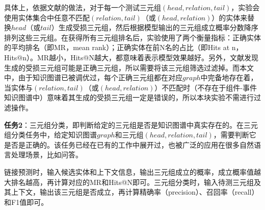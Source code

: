具体上，依据文献\parencite{bordes2013translatingE}的做法，对于每一个测试三元组$(head,relation,tail)$，实验会使用实体集合中任意不匹配$(relation,tail)$（或$(head,relation)$）的实体来替换$head$（或$tail$）生成受损三元组，然后根据模型输出的三元组成立概率分数降序排列这些三元组。在获得所有三元组排名后，实验使用了两个衡量指标：正确实体的平均排名（即MR，mean rank）；正确实体在前N名的占比（即Hits at n，Hits@n）。MR越小，Hits@N越大，都意味着表示模型效果越好。另外，文献\parencite{bordes2013translatingE}发现生成的受损三元组可能是正确三元组，所以需要将该三元组筛选过滤掉。而本文中，由于知识图谱已被调优过，每个正确三元组都在对应$graph$中完备地存在着，当实体与$(relation,tail)$（或$(head,relation)$）不匹配时（不存在于组件-事件知识图谱中）意味着其生成的受损三元组一定是错误的，所以本块实验不需进行过滤操作。

\textbf{任务2}：三元组分类，即判断给定的三元组是否是知识图谱中真实存在的。在三元组分类任务中，给定知识图谱$graph$和三元组$(head,relation,tail)$，需要判断它是否是正确的。该任务已经在已有的工作\cite{bordes2013translatingE,wang2014knowledge,lin2015learning}中展开过，也被广泛的应用在很多自然语言处理场景，比如问答。

链接预测时，输入候选实体和上下文信息，输出三元组成立的概率，成立概率值越大排名越高，再计算对应的MR和Hits@N即可。三元组分类时，输入待测三元组及其上下文，输出该三元组是否成立，再计算精确率（precision）、召回率（recall）和F1值即可。



